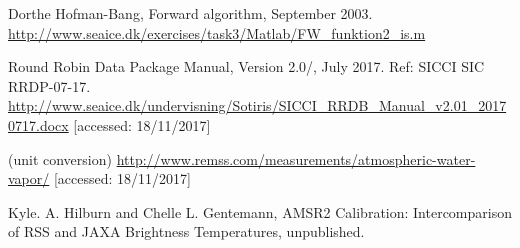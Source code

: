 \documentclass[11pt, a4paper]{article}
\begin{document}
\clearpage
\begin{thebibliography}{99}

	 Dorthe Hofman-Bang, Forward algorithm, September 2003. \newline \url{http://www.seaice.dk/exercises/task3/Matlab/FW_funktion2_is.m} \newline [accessed: 18/11/2017]
	
	
	 Round Robin Data Package Manual, Version 2.0/, July 2017. Ref: SICCI SIC RRDP-07-17. \newline
	\url{http://www.seaice.dk/undervisning/Sotiris/SICCI_RRDB_Manual_v2.01_20170717.docx} [accessed: 18/11/2017]
	
	 (unit conversion) \url{http://www.remss.com/measurements/atmospheric-water-vapor/} [accessed: 18/11/2017]
	

	 Kyle. A. Hilburn and Chelle L. Gentemann, AMSR2 Calibration: Intercomparison of RSS and JAXA Brightness Temperatures, unpublished.

	
\end{thebibliography}
\end{document}
